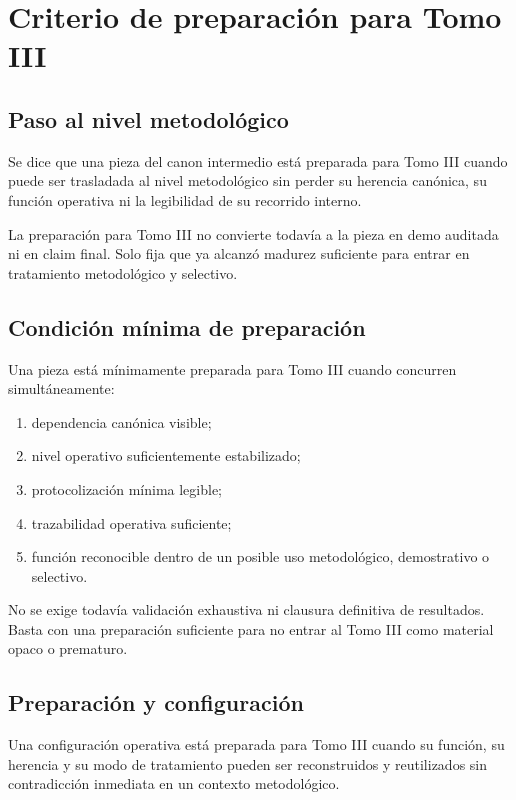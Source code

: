 \chapter{Criterio de preparación para Tomo III}

\section{Paso al nivel metodológico}
\begin{definition}
Se dice que una pieza del canon intermedio está preparada para Tomo III cuando puede ser trasladada al nivel metodológico sin perder su herencia canónica, su función operativa ni la legibilidad de su recorrido interno.
\end{definition}

\begin{observation}
La preparación para Tomo III no convierte todavía a la pieza en demo auditada ni en claim final. Solo fija que ya alcanzó madurez suficiente para entrar en tratamiento metodológico y selectivo.
\end{observation}

\section{Condición mínima de preparación}
\begin{definition}
Una pieza está mínimamente preparada para Tomo III cuando concurren simultáneamente:
\begin{enumerate}
  \item dependencia canónica visible;
  \item nivel operativo suficientemente estabilizado;
  \item protocolización mínima legible;
  \item trazabilidad operativa suficiente;
  \item función reconocible dentro de un posible uso metodológico, demostrativo o selectivo.
\end{enumerate}
\end{definition}

\begin{observation}
No se exige todavía validación exhaustiva ni clausura definitiva de resultados. Basta con una preparación suficiente para no entrar al Tomo III como material opaco o prematuro.
\end{observation}

\section{Preparación y configuración}
\begin{definition}
Una configuración operativa está preparada para Tomo III cuando su función, su herencia y su modo de tratamiento pueden ser reconstruidos y reutilizados sin contradicción inmediata en un contexto metodológico.
\end{definition}

